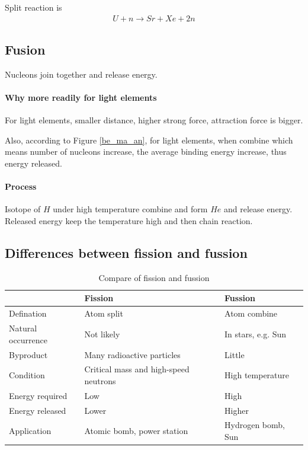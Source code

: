             Split reaction is
            \begin{align}
                U + n \to Sr + Xe + 2n
            \end{align}

    \subsection{Fusion}
        Nucleons join together and release energy.

        \paragraph{Why more readily for light elements}
            For light elements, smaller distance, higher strong force, attraction force is bigger.

            Also, according to Figure \ref{be_ma_an}, for light elements, when combine which means number of nucleons increase, the average binding energy increase, thus energy released.

        \paragraph{Process}
            Isotope of $H$ under high temperature combine and form $He$ and release energy. Released energy keep the temperature high and then chain reaction.
        
    \subsection{Differences between fission and fussion}
        \begin{table}[H]
            \begin{center}
                \begin{tabular}{l|ll}
                     & Fission & Fussion \\
                    \hline
                    Defination & Atom split & Atom combine \\
                    Natural occurrence & Not likely & In stars, e.g. Sun \\
                    Byproduct & Many radioactive particles & Little \\
                    Condition & Critical mass and high-speed neutrons & High temperature \\
                    Energy required & Low & High \\
                    Energy released & Lower & Higher \\
                    Application & Atomic bomb, power station & Hydrogen bomb, Sun
                \end{tabular}
            \end{center}
            \caption{Compare of fission and fussion}
            \label{comp_fis_fus}
        \end{table}

